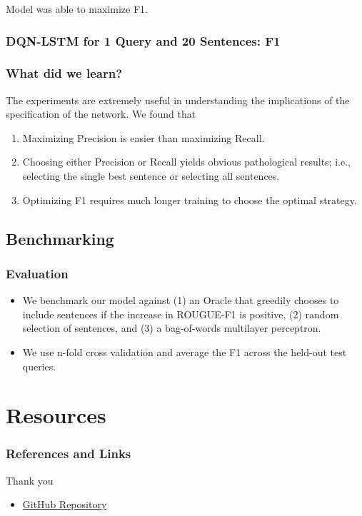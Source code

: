 \documentclass[]{beamer}
\begin{document}
		\begin{frame}
			Model was able to maximize F1.
			\frametitle{DQN-LSTM for 1 Query and 20 Sentences: F1}
			\begin{center}
			\end{center}
		\end{frame}

		\begin{frame}
			\frametitle{What did we learn?}
			The experiments are extremely useful in understanding the implications of the specification of the network. We found that 
			\begin{center}
				\begin{enumerate}
					\item<1-> Maximizing Precision is easier than maximizing Recall.
					\item<1-> Choosing either Precision or Recall yields obvious pathological results; i.e., selecting the single best sentence or selecting all sentences.
					\item<1-> Optimizing F1 requires much longer training to choose the optimal strategy.
				\end{enumerate}
			\end{center}
		\end{frame}

	\subsection{Benchmarking}
		\begin{frame}
			\frametitle{Evaluation}
			\begin{itemize}
		\item<1-> We benchmark our model against (1) an Oracle that greedily chooses to include sentences if the increase in ROUGUE-F1 is positive,  (2) random selection of sentences,  and (3) a bag-of-words multilayer perceptron.
		\item<1-> We use n-fold cross validation and average the F1 across the held-out test queries.
		\end{itemize}
	\end{frame}



\section{Resources}
\begin{frame}
	\frametitle{References and Links}
	Thank you
	\begin{itemize}
	\item<1-> \color{blue} \href{https://github.com/franciscojavierarceo/DQN-Event-Summarization}{GitHub Repository}
	\end{itemize}
\end{frame}


\end{document}
